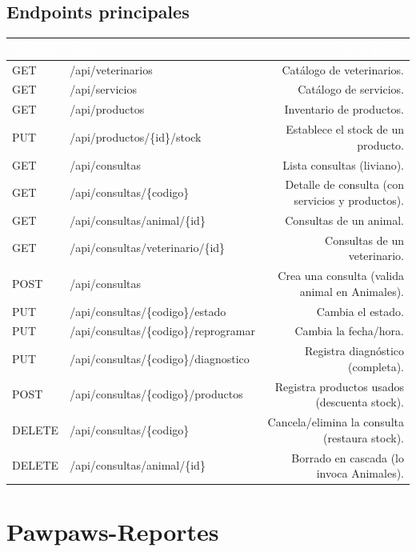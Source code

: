 \documentclass[11pt,a4paper]{article}
\begin{document}
\subsection{Endpoints principales}
\begin{center}
\begin{longtable}{M P D}
\textcolor{white}{\textbf{Método}} & \textcolor{white}{\textbf{Ruta}} & \textcolor{white}{\textbf{Descripción}} \\
\midrule \endhead
GET    & /api/veterinarios          & Catálogo de veterinarios. \\
GET    & /api/servicios             & Catálogo de servicios. \\
GET    & /api/productos             & Inventario de productos. \\
PUT    & /api/productos/\{id\}/stock  & Establece el stock de un producto. \\
GET    & /api/consultas             & Lista consultas (liviano). \\
GET    & /api/consultas/\{codigo\}    & Detalle de consulta (con servicios y productos). \\
GET    & /api/consultas/animal/\{id\} & Consultas de un animal. \\
GET    & /api/consultas/veterinario/\{id\} & Consultas de un veterinario. \\
POST   & /api/consultas             & Crea una consulta (valida animal en Animales). \\
PUT    & /api/consultas/\{codigo\}/estado     & Cambia el estado. \\
PUT    & /api/consultas/\{codigo\}/reprogramar & Cambia la fecha/hora. \\
PUT    & /api/consultas/\{codigo\}/diagnostico & Registra diagnóstico (completa). \\
POST   & /api/consultas/\{codigo\}/productos   & Registra productos usados (descuenta stock). \\
DELETE & /api/consultas/\{codigo\}    & Cancela/elimina la consulta (restaura stock). \\
DELETE & /api/consultas/animal/\{id\} & Borrado en cascada (lo invoca Animales). \\
\end{longtable}
\end{center}

\section{Pawpaws-Reportes}
\end{document}
